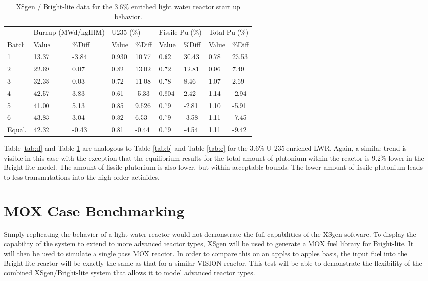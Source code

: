 \documentclass{article}
\begin{document}
\begin{table}[!htb]
\centering
\caption{XSgen / Bright-lite data for the 3.6\% enriched light water reactor start up behavior.}
\label{tab:e}
\begin{tabular}{l ll | ll | ll | ll}
 & \multicolumn{2}{l}{Burnup (MWd/kgIHM)} & \multicolumn{2}{l}{U235 (\%)} & \multicolumn{2}{l}{Fissile Pu (\%)} & \multicolumn{2}{l}{Total Pu (\%)} \\
Batch & Value & \%Diff & Value & \%Diff & Value & \%Diff & Value & \%Diff \\
1 & 13.37 & -3.84 & 0.930 & 10.77 & 0.62 & 30.43 & 0.78 & 23.53 \\
2 & 22.69 & 0.07 & 0.82 & 13.02 & 0.72 & 12.81 & 0.96 & 7.49 \\
3 & 32.38 & 0.03 & 0.72 & 11.08 & 0.78 & 8.46 & 1.07 & 2.69 \\
4 & 42.57 & 3.83 & 0.61 & -5.33 & 0.804 & 2.42 & 1.14 & -2.94 \\
5 & 41.00 & 5.13 & 0.85 & 9.526 & 0.79 & -2.81 & 1.10 & -5.91 \\
6 & 43.83 & 3.04 & 0.82 & 6.53 & 0.79 & -3.58 & 1.11 & -7.45 \\
Equal. & 42.32 & -0.43 & 0.81 & -0.44 & 0.79 & -4.54 & 1.11 & -9.42
\end{tabular}
\end{table}

Table \ref{tab:d} and Table \ref{tab:e} are analogous to Table \ref{tab:b} and Table \ref{tab:c}
for the 3.6\% U-235 enriched LWR. Again, a similar trend is visible in this case with the
exception that the equilibrium results for the total amount of plutonium within the
reactor is 9.2\% lower in the Bright-lite model. The amount of fissile plutonium is also lower, but within acceptable bounds. The lower amount of fissile plutonium leads to less transmutations into the high order actinides.

\section{MOX Case Benchmarking}
Simply replicating the behavior of a light water reactor would not demonstrate the full capabilities of the XSgen software. To display the capability of the system to extend to more advanced reactor types, XSgen will be used to generate a MOX fuel library for Bright-lite. It will then be used to simulate a single pass MOX reactor. In order to compare this on an apples to apples basis, the input fuel into the Bright-lite reactor will be exactly the same as that for a similar VISION reactor. This test will be able to demonstrate the flexibility of the combined XSgen/Bright-lite system that allows it to model advanced reactor types.
\end{document}
